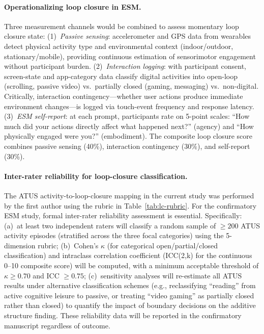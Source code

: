 \documentclass[a4paper,11pt,titlepage]{article}
\begin{document}
\paragraph{Operationalizing loop closure in ESM.}
Three measurement channels would be combined to assess momentary loop closure state: (1)~\textit{Passive sensing}: accelerometer and GPS data from wearables detect physical activity type and environmental context (indoor/outdoor, stationary/mobile), providing continuous estimation of sensorimotor engagement without participant burden. (2)~\textit{Interaction logging}: with participant consent, screen-state and app-category data classify digital activities into open-loop (scrolling, passive video) vs.\ partially closed (gaming, messaging) vs.\ non-digital. Critically, interaction contingency---whether user actions produce immediate environment changes---is logged via touch-event frequency and response latency. (3)~\textit{ESM self-report}: at each prompt, participants rate on 5-point scales: ``How much did your actions directly affect what happened next?'' (agency) and ``How physically engaged were you?'' (embodiment). The composite loop closure score combines passive sensing (40\%), interaction contingency (30\%), and self-report (30\%).

\paragraph{Inter-rater reliability for loop-closure classification.}
The ATUS activity-to-loop-closure mapping in the current study was performed by the first author using the rubric in Table~\ref{tab:lc-rubric}. For the confirmatory ESM study, formal inter-rater reliability assessment is essential. Specifically: (a)~at least two independent raters will classify a random sample of $\geq 200$ ATUS activity episodes (stratified across the three focal categories) using the 5-dimension rubric; (b)~Cohen's $\kappa$ (for categorical open/partial/closed classification) and intraclass correlation coefficient (ICC(2,k) for the continuous 0--10 composite score) will be computed, with a minimum acceptable threshold of $\kappa \geq 0.70$ and ICC $\geq 0.75$; (c)~sensitivity analyses will re-estimate all ATUS results under alternative classification schemes (e.g., reclassifying ``reading'' from active cognitive leisure to passive, or treating ``video gaming'' as partially closed rather than closed) to quantify the impact of boundary decisions on the additive structure finding. These reliability data will be reported in the confirmatory manuscript regardless of outcome.
\end{document}
